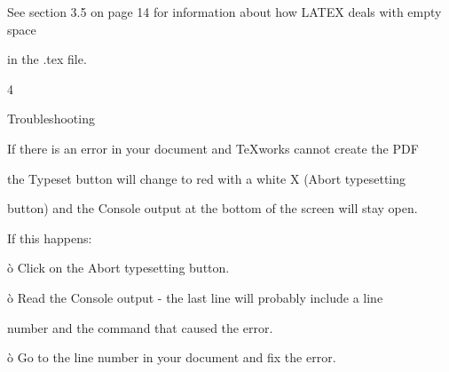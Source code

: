 \documentclass[a4paper,portrait,12pt]{article}
\begin{document}
\begin{flushleft}
See section 3.5 on page 14 for information about how LATEX deals with empty space
\end{flushleft}


\begin{flushleft}
in the .tex file.
\end{flushleft}





4










\begin{flushleft}
Troubleshooting
\end{flushleft}





\begin{flushleft}
If there is an error in your document and TeXworks cannot create the PDF
\end{flushleft}


\begin{flushleft}
the Typeset button will change to red with a white X (Abort typesetting
\end{flushleft}


\begin{flushleft}
button) and the Console output at the bottom of the screen will stay open.
\end{flushleft}


\begin{flushleft}
If this happens:
\end{flushleft}


\begin{flushleft}
\`{o} Click on the Abort typesetting button.
\end{flushleft}


\begin{flushleft}
\`{o} Read the Console output - the last line will probably include a line
\end{flushleft}


\begin{flushleft}
number and the command that caused the error.
\end{flushleft}


\begin{flushleft}
\`{o} Go to the line number in your document and fix the error.
\end{flushleft}
\end{document}

